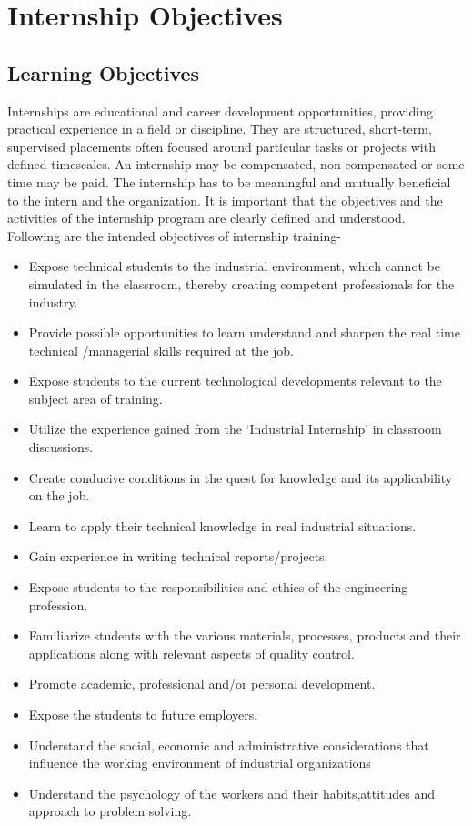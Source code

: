 \chapter{Internship Objectives}
\section{Learning Objectives}

Internships are educational and career development opportunities, providing practical experience in a field or discipline. They are structured, short-term, supervised placements often focused around particular tasks or projects with defined timescales. An internship may be compensated, non-compensated or some time may be paid. The internship has to be meaningful and mutually beneficial to the intern and the organization. It is important that the objectives and the activities of the internship program are clearly defined and understood. \\

Following are the intended objectives of internship training-

\begin{itemize}
\item Expose technical students to the industrial environment, which cannot be simulated in the classroom, thereby creating competent professionals for the industry.
\item Provide possible opportunities to learn understand and sharpen the real time technical /managerial skills required at the job.
\item Expose students to the current technological developments relevant to the subject area of training.
\item Utilize the experience gained from the ‘Industrial Internship’ in classroom discussions.
\item Create conducive conditions in the quest for knowledge and its applicability on the job.
\item Learn to apply their technical knowledge in real industrial situations.
\item Gain experience in writing technical reports/projects.
\item Expose students to the responsibilities and ethics of the engineering profession.
\item Familiarize students with the various materials, processes, products and their applications along with relevant aspects of quality control.
\item Promote academic, professional and/or personal development.
\item Expose the students to future employers.
\item Understand the social, economic and administrative considerations that influence the working environment of industrial organizations
\item Understand the psychology of the workers and their habits,attitudes and approach to problem solving.
\end{itemize}

